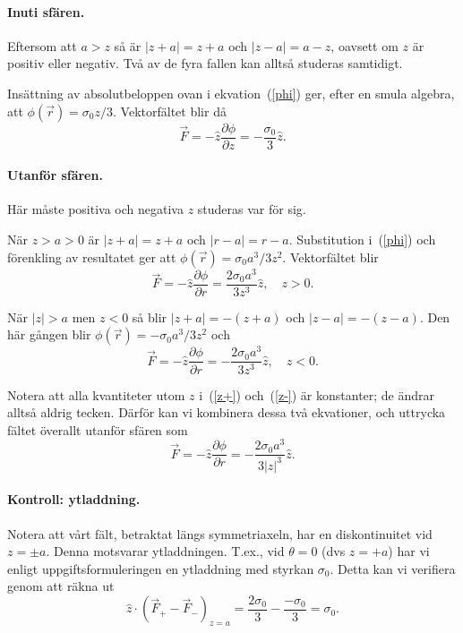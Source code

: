 \documentclass[%
oneside,                 %
final,                   %
10pt]{article}
\newenvironment{doconceexercise}{}{}
\begin{document}
\begin{doconceexercise}
\paragraph{Inuti sfären.}
Eftersom att $a>z$ så är $|z+a|=z+a$ och $|z-a|=a-z$, oavsett om $z$ är positiv eller negativ. Två av de fyra fallen kan alltså studeras samtidigt. 

Insättning av absolutbeloppen ovan i ekvation~(\ref{phi}) ger, efter en smula algebra, att $\phi(\vec r)=\sigma_0 z/3$. Vektorfältet blir då
\begin{equation}
    \vec F =-\hat z\frac{\partial\phi}{\partial z}=-\frac{\sigma_0}3\hat z.
\end{equation}

\paragraph{Utanför sfären.}
Här måste positiva och negativa $z$ studeras var för sig.

När $z>a>0$ är $|z+a|=z+a$ och $|r-a|=r-a$. Substitution i~(\ref{phi}) och förenkling av resultatet ger att $\phi(\vec r)=\sigma_0a^3/3z^2$. Vektorfältet blir 
\begin{equation}
    \vec F =-\hat z\frac{\partial\phi}{\partial r}=\frac{2\sigma_0a^3}{3z^3}\hat z,\quad z>0. \label{z+}
\end{equation}

När $|z|>a$ men $z<0$ så blir $|z+a|=-(z+a)$ och $|z-a|=-(z-a)$. Den här gången blir $\phi(\vec r)=-\sigma_0a^3/3z^2$ och 
\begin{equation}
    \vec F =-\hat z\frac{\partial\phi}{\partial r}=-\frac{2\sigma_0a^3}{3z^3}\hat z,\quad z<0.\label{z-}
\end{equation}

Notera att alla kvantiteter utom $z$ i~(\ref{z+}) och~(\ref{z-}) är konstanter; de ändrar alltså aldrig tecken. Därför kan vi kombinera dessa två ekvationer, och uttrycka fältet överallt utanför sfären som
\begin{equation}
    \vec F =-\hat z\frac{\partial\phi}{\partial r}=-\frac{2\sigma_0a^3}{3|z|^3}\hat z.
\end{equation}

\paragraph{Kontroll: ytladdning.}
Notera att vårt fält, betraktat längs symmetriaxeln, har en diskontinuitet vid $z=\pm a$. Denna motsvarar ytladdningen. T.ex., vid $\theta = 0$ (dvs $z=+a$) har vi enligt uppgiftsformuleringen en ytladdning med styrkan $\sigma_0$. Detta kan vi verifiera genom att räkna ut
\begin{equation}
\hat{z} \cdot \left( \vec{F}_+ - \vec{F}_- \right)_{z=a} = \frac{2\sigma_0}{3} - \frac{-\sigma_0}{3} = \sigma_0.
\end{equation}


\end{doconceexercise}



\end{document}
